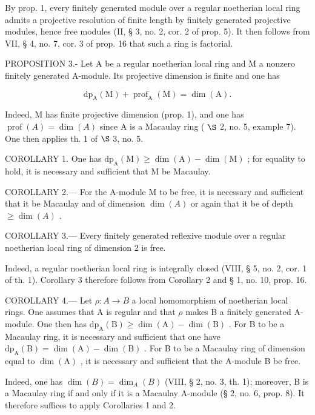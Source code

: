 By prop. 1, every finitely generated module over a regular noetherian local ring admits a projective resolution of finite length by finitely generated projective modules, hence free modules (II, § 3, no. 2, cor. 2 of prop. 5). It then follows from VII, § 4, no. 7, cor. 3 of prop. 16 that such a ring is factorial.

PROPOSITION 3.- Let A be a regular noetherian local ring and M a nonzero finitely generated A-module. Its projective dimension is finite and one has

\[
\mathrm{dp} _ {\mathrm{A}} (\mathrm{M}) + \operatorname{prof} _ {\mathrm{A}} (\mathrm{M}) = \dim (\mathrm{A}).
\]

Indeed, M has finite projective dimension (prop. 1), and one has \(\operatorname{prof}(A) = \dim(A)\) since A is a Macaulay ring ( \(\S\) 2, no. 5, example 7). One then applies th. 1 of \(\S\) 3, no. 5.

COROLLARY 1. One has \(\mathrm{dp}_{\mathrm{A}}(\mathrm{M}) \geqslant \dim(\mathrm{A}) - \dim(\mathrm{M})\) ; for equality to hold, it is necessary and sufficient that M be Macaulay.

COROLLARY 2.--- For the A-module M to be free, it is necessary and sufficient that it be Macaulay and of dimension \(\dim(A)\) or again that it be of depth \(\geqslant \dim(A)\) .

COROLLARY 3.--- Every finitely generated reflexive module over a regular noetherian local ring of dimension 2 is free.

Indeed, a regular noetherian local ring is integrally closed (VIII, § 5, no. 2, cor. 1 of th. 1). Corollary 3 therefore follows from Corollary 2 and § 1, no. 10, prop. 16.

COROLLARY 4.--- Let \(\rho: A \to B\) a local homomorphism of noetherian local rings. One assumes that A is regular and that \(\rho\) makes B a finitely generated A-module. One then has \(\mathrm{dp}_{\mathrm{A}}(\mathrm{B}) \geqslant \dim(\mathrm{A}) - \dim(\mathrm{B})\) . For B to be a Macaulay ring, it is necessary and sufficient that one have \(\mathrm{dp}_{\mathrm{A}}(\mathrm{B}) = \dim(\mathrm{A}) - \dim(\mathrm{B})\) . For B to be a Macaulay ring of dimension equal to \(\dim(\mathrm{A})\) , it is necessary and sufficient that the A-module B be free.

Indeed, one has \(\dim(B) = \dim_A(B)\) (VIII, § 2, no. 3, th. 1); moreover, B is a Macaulay ring if and only if it is a Macaulay A-module (§ 2, no. 6, prop. 8). It therefore suffices to apply Corollaries 1 and 2.

